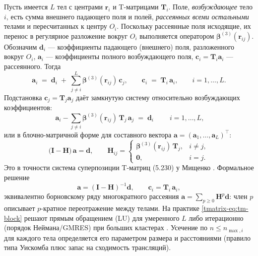 \documentclass[11pt,a4paper]{article}
\begin{document}
Пусть имеется $L$ тел с центрами $\bm{r}_i$ и T-матрицами $\mathbf{T}_i$. Поле, \emph{возбуждающее} тело $i$, есть сумма внешнего падающего поля и полей, \emph{рассеянных всеми остальными} телами и пересчитанных к центру $O_i$. Поскольку рассеянные поля исходящие, их перенос в регулярное разложение вокруг $O_i$ выполняется оператором $\bm{\beta}^{(3)}(\bm{r}_{ij})$. Обозначим $\bm{d}_i$ --- коэффициенты падающего (внешнего) поля, разложенного вокруг $O_i$, $\bm{a}_i$ --- коэффициенты полного возбуждающего поля, $\bm{c}_i=\mathbf{T}_i\bm{a}_i$ --- рассеянного. Тогда \cite{xu1995,mishchenko2002}
\begin{equation}
\bm{a}_i \;=\; \bm{d}_i \;+\; \sum_{j\ne i}^{L}\bm{\beta}^{(3)}(\bm{r}_{ij})\,\bm{c}_j,
\qquad
\bm{c}_i \;=\; \mathbf{T}_i\,\bm{a}_i,
\qquad i=1,\dots,L.
\label{tmatrix-eq:tm-selfcons}
\end{equation}
Подстановка $\bm{c}_j=\mathbf{T}_j\bm{a}_j$ даёт замкнутую систему относительно возбуждающих коэффициентов:
\begin{equation}
\boxed{\;\bm{a}_i - \sum_{j\ne i}\bm{\beta}^{(3)}(\bm{r}_{ij})\,\mathbf{T}_j\,\bm{a}_j \;=\; \bm{d}_i\;}
\qquad i=1,\dots,L,
\label{tmatrix-eq:tm-linsys}
\end{equation}
или в блочно-матричной форме для составного вектора $\bm{a}=(\bm{a}_1,\dots,\bm{a}_L)^{\!\top}$:
\begin{equation}
\bigl(\mathbf{I}-\mathbf{H}\bigr)\,\bm{a}=\bm{d},
\qquad
\mathbf{H}_{ij}=
\begin{cases}
\bm{\beta}^{(3)}(\bm{r}_{ij})\,\mathbf{T}_j, & i\ne j,\\[2pt]
\mathbf{0}, & i=j.
\end{cases}
\label{tmatrix-eq:tm-block}
\end{equation}
Это в точности система суперпозиции T-матриц (5.230) у Мищенко \cite{mishchenko2002}. Формальное решение
\begin{equation}
\bm{a}=(\mathbf{I}-\mathbf{H})^{-1}\bm{d},
\qquad
\bm{c}_i=\mathbf{T}_i\,\bm{a}_i,
\label{tmatrix-eq:tm-solve}
\end{equation}
эквивалентно борновскому ряду многократного рассеяния $\bm{a}=\sum_{p\ge0}\mathbf{H}^p\bm{d}$: член $p$ описывает $p$-кратное переотражение между телами. На практике \eqref{tmatrix-eq:tm-block} решают прямым обращением (LU) для умеренного $L$ либо итерационно (порядок Неймана/GMRES) при больших кластерах \cite{xu1995}. Усечение по $n\le n_{\max,i}$ для каждого тела определяется его параметром размера и расстояниями (правило типа Уискомба плюс запас на сходимость трансляций).
\end{document}
